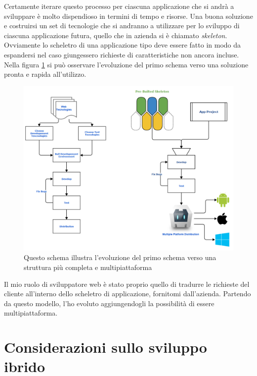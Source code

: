 Certamente iterare questo processo per ciascuna applicazione che si andrà a sviluppare è molto dispendioso in termini di tempo e risorse. Una buona soluzione e costruirsi un set di tecnologie che si andranno a utilizzare per lo sviluppo di ciascuna applicazione futura, quello che in azienda si è chiamato \emph{skeleton}. Ovviamente lo scheletro di una applicazione tipo deve essere fatto in modo da espandersi nel caso giungessero richieste di caratteristiche non ancora incluse. Nella figura \ref{fig:flow_match} si può osservare l'evoluzione del primo schema verso una soluzione pronta e rapida all'utilizzo.

\begin{figure}
	\begin{center}
		\includegraphics[scale=0.5]{Figures/match_flow.png}
		\caption[Schemi di sviluppo a confronto]{Questo schema illustra l'evoluzione del primo schema verso una struttura più completa e multipiattaforma}
		\label{fig:flow_match}
	\end{center}
\end{figure}

Il mio ruolo di sviluppatore web è stato proprio quello di tradurre le richieste del cliente all'interno dello scheletro di applicazione, fornitomi dall'azienda. Partendo da questo modello, l'ho evoluto aggiungendogli la possibilità di essere multipiattaforma.


\section{Considerazioni sullo sviluppo ibrido}

